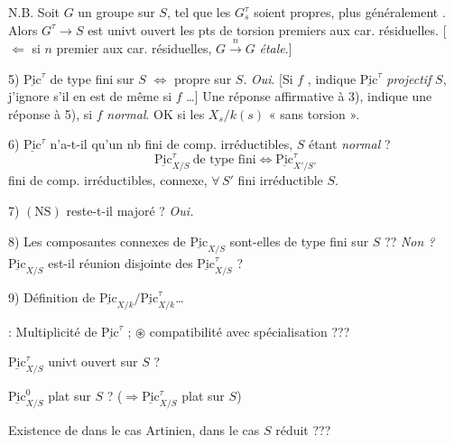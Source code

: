 \documentclass[11pt,a4paper]{article}
\begin{document}
N.B. Soit $G$ un \struck{\ill{}} \ill{} groupe sur $S$, tel que les $G^{\tau}_s$ soient propres, plus généralement . Alors $G^{\tau} \to S$ est univt ouvert \ill{} les \ill{} pts de torsion \ill{} premiers aux car. résiduelles. [$\Leftarrow$ si $n$ premier aux car. résiduelles, \ill{} $G \xrightarrow{n} G$  \emph{étale}.]

5) $\underline{\mathrm{Pic}}^{\tau}$ de type fini sur $S$ $\Leftrightarrow$ propre sur $S$. \emph{Oui}.
[Si $f$ \ill{}, \ill{} indique $\underline{\mathrm{Pic}}^{\tau}$ \emph{projectif}  $S$, j'ignore s'il en est de même si $f$ \ill{}…]
Une réponse affirmative à 3), \ill{} indique une réponse \struck{\ill{}}  à 5), si $f$ \emph{normal}.
OK si les $X_s/k(s)$ « sans torsion ».

6) $\underline{\mathrm{Pic}}^{\tau}$ \struck{\ill{}} n'a-t-il qu'un nb fini de comp. irréductibles, $S$ étant \emph{normal} ?
\[ \underline{\mathrm{Pic}}^{\tau}_{X/S} \ \text{de type fini} \Longleftrightarrow \underline{\mathrm{Pic}}^{\tau}_{X'/S'} \]
\ill{} \ill{} fini de comp. irréductibles, \ill{} \ill{} connexe, $\forall\, S'$ fini irréductible  $S$.

7) $(\mathrm{NS})$ reste-t-il majoré ? \emph{Oui.}

8) \struck{\ill{}} Les composantes connexes de $\underline{\mathrm{Pic}}_{X/S}$ sont-elles de type fini sur $S$ ?? \emph{Non ?}
$\underline{\mathrm{Pic}}_{X/S}$ est-il réunion disjointe \struck{\ill{}} des $\underline{\mathrm{Pic}}^{\tau}_{X/S}$ ?

9) Définition de $\underline{\mathrm{Pic}}_{X/k} / \underline{\mathrm{Pic}}^{\tau}_{X/k}$…

 : Multiplicité de $\underline{\mathrm{Pic}}^{\tau}$ ; $\circledast$ compatibilité avec spécialisation ???

$\underline{\mathrm{Pic}}^{\tau}_{X/S}$ univt ouvert sur $S$ ?

$\underline{\mathrm{Pic}}^{0}_{X/S}$ plat sur $S$ ? ($\Rightarrow \underline{\mathrm{Pic}}^{\tau}_{X/S}$ plat sur $S$)

Existence de  dans le cas Artinien, dans le cas $S$ réduit  ???
\end{document}
